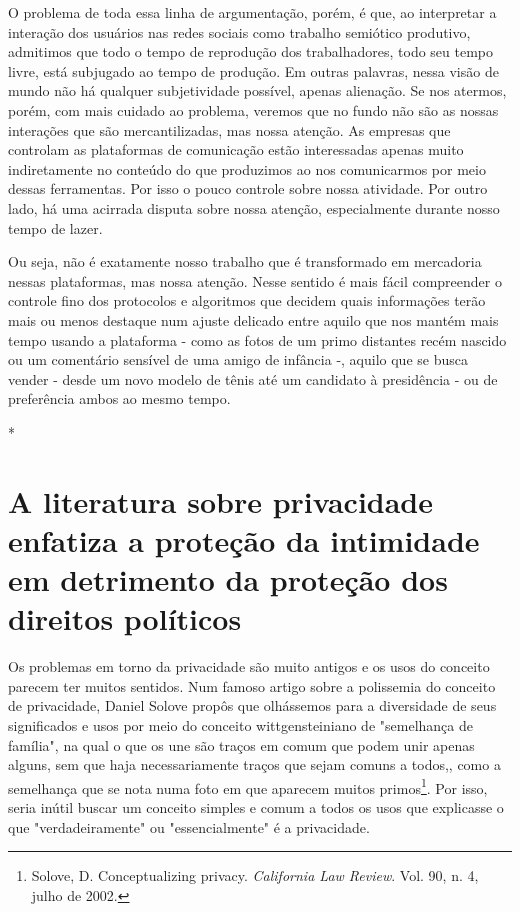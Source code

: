 O problema de toda essa linha de argumentação, porém, é que, ao
interpretar a interação dos usuários nas redes sociais como trabalho
semiótico produtivo, admitimos que todo o tempo de reprodução dos
trabalhadores, todo seu tempo livre, está subjugado ao tempo de
produção. Em outras palavras, nessa visão de mundo não há qualquer
subjetividade possível, apenas alienação. Se nos atermos, porém, com
mais cuidado ao problema, veremos que no fundo não são as nossas
interações que são mercantilizadas, mas nossa atenção. As empresas que
controlam as plataformas de comunicação estão interessadas apenas muito
indiretamente no conteúdo do que produzimos ao nos comunicarmos por meio
dessas ferramentas. Por isso o pouco controle sobre nossa atividade. Por
outro lado, há uma acirrada disputa sobre nossa atenção, especialmente
durante nosso tempo de lazer.

Ou seja, não é exatamente nosso trabalho que é transformado em
mercadoria nessas plataformas, mas nossa atenção. Nesse sentido é mais
fácil compreender o controle fino dos protocolos e algoritmos que
decidem quais informações terão mais ou menos destaque num ajuste
delicado entre aquilo que nos mantém mais tempo usando a plataforma -
como as fotos de um primo distantes recém nascido ou um comentário
sensível de uma amigo de infância -, aquilo que se busca vender - desde
um novo modelo de tênis até um candidato à presidência - ou de
preferência ambos ao mesmo tempo.

*

\section{A literatura sobre privacidade enfatiza a proteção da intimidade
em detrimento da proteção dos direitos políticos}

Os problemas em torno da privacidade são muito antigos e os usos do
conceito parecem ter muitos sentidos. Num famoso artigo sobre a
polissemia do conceito de privacidade, Daniel Solove propôs que
olhássemos para a diversidade de seus significados e usos por meio do
conceito wittgensteiniano de "semelhança de família", na qual o que os
une são traços em comum que podem unir apenas alguns, sem que haja
necessariamente traços que sejam comuns a todos,, como a semelhança que
se nota numa foto em que aparecem muitos primos\footnote{Solove,
  D. Conceptualizing privacy. \emph{California Law Review}. Vol. 90, n.
  4, julho de 2002.}. Por isso, seria inútil buscar um conceito simples
e comum a todos os usos que explicasse o que "verdadeiramente" ou
"essencialmente" é a privacidade.

